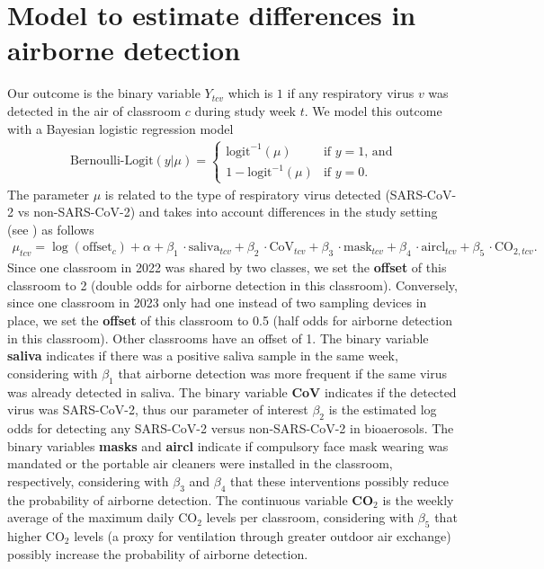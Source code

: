 \documentclass[fleqn,11pt]{wlscirep_supp}
\begin{document}
\clearpage

\section{Model to estimate differences in airborne detection}\label{sec:model}

Our outcome is the binary variable $Y_{tcv}$ which is $1$ if any respiratory virus $v$ was detected in the air of classroom $c$ during study week $t$. We model this outcome with a Bayesian logistic regression model
\begin{align}
    \text{Bernoulli-Logit}(y|\mu) = \begin{cases}
        \text{logit}^{-1}(\mu) & \text{if }y=1\text{, and} \\
        1-\text{logit}^{-1}(\mu) & \text{if }y=0.
    \end{cases}
\end{align}
The parameter $\mu$ is related to the type of respiratory virus detected (SARS-CoV-2 vs non-SARS-CoV-2) and takes into account differences in the study setting (see ) as follows
\begin{align}
    \mu_{tcv} = \log(\text{offset}_c) + \alpha + \beta_1\,\cdot\text{saliva}_{tcv} + \beta_2\,\cdot\text{CoV}_{tcv} + \beta_3\,\cdot\text{mask}_{tcv} + \beta_4\,\cdot\text{aircl}_{tcv} + \beta_5\,\cdot\text{CO}_{2,tcv}.
\end{align}
Since one classroom in 2022 was shared by two classes, we set the \textbf{offset} of this classroom to 2 (double odds for airborne detection in this classroom). Conversely, since one classroom in 2023 only had one instead of two sampling devices in place, we set the \textbf{offset} of this classroom to 0.5 (half odds for airborne detection in this classroom). Other classrooms have an offset of 1. The binary variable \textbf{saliva} indicates if there was a positive saliva sample in the same week, considering with $\beta_1$ that airborne detection was more frequent if the same virus was already detected in saliva. The binary variable \textbf{CoV} indicates if the detected virus was SARS-CoV-2, thus our parameter of interest $\beta_2$ is the estimated log odds for detecting any SARS-CoV-2 versus non-SARS-CoV-2 in bioaerosols. The binary variables \textbf{masks} and \textbf{aircl} indicate if compulsory face mask wearing was mandated or the portable air cleaners were installed in the classroom, respectively, considering with $\beta_3$ and $\beta_4$ that these interventions possibly reduce the probability of airborne detection. The continuous variable \textbf{CO}$_2$ is the weekly average of the maximum daily CO$_2$ levels per classroom, considering with $\beta_5$ that higher CO$_2$ levels (a proxy for ventilation through greater outdoor air exchange) possibly increase the probability of airborne detection.
\end{document}

